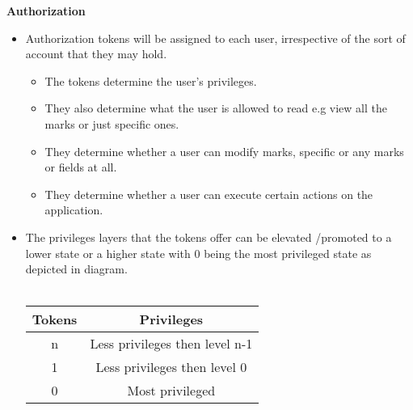 \documentclass[10pt,a4paper]{article}
\begin{document}
\begin{center}\textbf{Authorization}\end{center}
                \begin{itemize}
                        \item Authorization tokens will be assigned to each user, irrespective of the sort of account that they may hold.
                        \begin{itemize}
                                \item The tokens determine the user’s privileges.
                        \end{itemize}
                        \begin{itemize}
                                \item They also determine what the user is allowed to read  e.g view all the marks or just specific ones.
                        \end{itemize}
                        \begin{itemize}
                                \item They determine whether a user can modify marks, specific or any marks or fields at all.
                        \end{itemize}
                        \begin{itemize}
                                \item They determine whether a user can execute certain actions on the application.
                        \end{itemize}
                \end{itemize}
                \begin{itemize}
                        \item
                        The privileges layers that the tokens offer can be elevated /promoted to a lower state or a higher state with 0 being the most privileged state as depicted in diagram.\\\\\begin{tabular}{|c|c|}\hline
                        Tokens   & Privileges \\\hline
                        n & Less privileges then level n-1\\\hline
                        1 & Less privileges then level 0\\\hline
                        0 & Most privileged\\\hline
                \end{tabular}
                \end{itemize}
\end{document}
